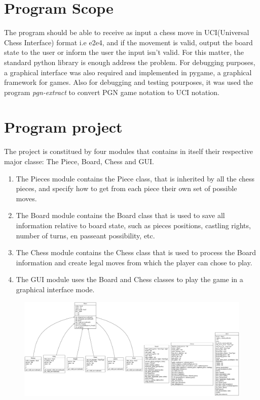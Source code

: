 \documentclass[10pt]{article}
\author{}
\title{}
\date{}
\begin{document}
\maketitle

\section{Program Scope}

The program should be able to receive as input a chess move in UCI(Universal
Chess Interface) format i.e
e2e4, and if the movement is valid, output the board state to the user or inform
the user the input isn't valid. For this matter, the standard python library is
enough address the problem. For debugging purposes, a graphical interface was
also required and implemented in pygame, a graphical framework for games. Also
for debugging and testing pourposes, it was used the program
\textit{pgn-extract} to convert PGN game notation to UCI notation.


\section{Program project}

The project is constitued by four modules that contains in itself their
respective major classe: The Piece, Board, Chess and GUI.
\begin{enumerate}
    \item The Pieces module contains the Piece class, that is inherited by all
        the chess pieces, and specify how to get from each piece their own set
        of possible moves.
        \item The Board module contains the Board class that is used to save all
            information relative to board state, such as pieces positions,
            castling rights, number of turns, en passeant possibility, etc.
        \item The Chess module contains the Chess class that is used to process
            the Board information and create legal moves from which the player
            can chose to play.
        \item The GUI module uses the Board and Chess classes to play the game
            in a graphical interface mode.
\end{enumerate}


\begin{figure}[H]
    \includegraphics[scale=0.2]{fig/classes_Chess.png}
\end{figure}
\end{document}
